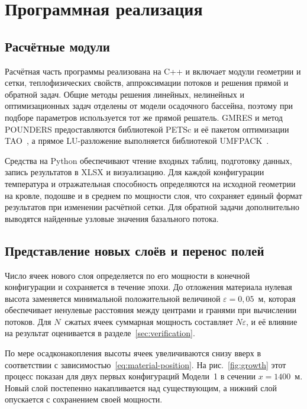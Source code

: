 \section{Программная реализация}
\label{sec:implementation}

\subsection{Расчётные модули}

Расчётная часть программы реализована на C++ и включает модули геометрии и сетки, теплофизических свойств, аппроксимации потоков и решения прямой и обратной задач. Общие методы решения линейных, нелинейных и оптимизационных задач отделены от модели осадочного бассейна, поэтому при подборе параметров используется тот же прямой решатель. GMRES и метод POUNDERS предоставляются библиотекой PETSc и её пакетом оптимизации TAO~\cite{petscManual,petsc1997}, а прямое LU-разложение выполняется библиотекой UMFPACK~\cite{umfpack2004}.

Средства на Python обеспечивают чтение входных таблиц, подготовку данных, запись результатов в XLSX и визуализацию. Для каждой конфигурации температура и отражательная способность определяются на исходной геометрии на кровле, подошве и в среднем по мощности слоя, что сохраняет единый формат результатов при изменении расчётной сетки. Для обратной задачи дополнительно выводятся найденные узловые значения базального потока.

\subsection{Представление новых слоёв и перенос полей}

Число ячеек нового слоя определяется по его мощности в конечной конфигурации и сохраняется в течение эпохи. До отложения материала нулевая высота заменяется минимальной положительной величиной $\varepsilon=0{,}05$~м, которая обеспечивает ненулевые расстояния между центрами и гранями при вычислении потоков. Для $N$~сжатых ячеек суммарная мощность составляет $N\varepsilon$, и её влияние на результат оценивается в разделе~\ref{sec:verification}.

По мере осадконакопления высоты ячеек увеличиваются снизу вверх в соответствии с зависимостью~\eqref{eq:material-position}. На рис.~\ref{fig:growth} этот процесс показан для двух первых конфигураций Модели~1 в сечении $x=1400$~м. Новый слой постепенно накапливается над существующим, а нижний слой опускается с сохранением своей мощности.

